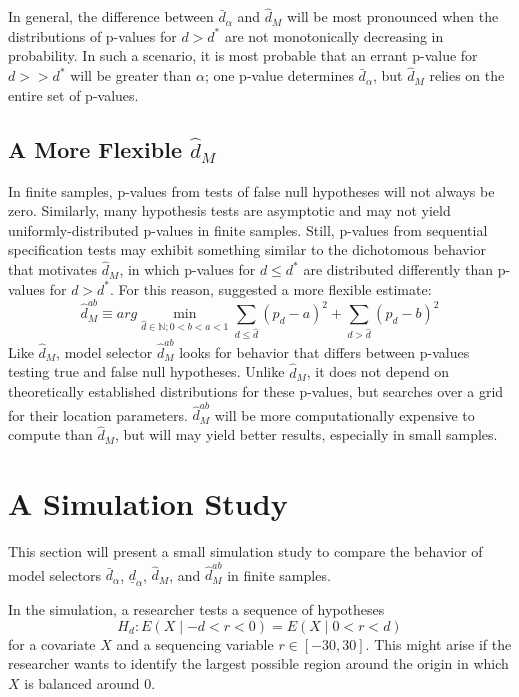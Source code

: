 \documentclass[lineno]{biometrika}\usepackage[]{graphicx}\usepackage[]{color}
\newcommand{\dalphaU}{\bar{d}_\alpha}
\newcommand{\dalphaB}{\underline{d}_\alpha}
\newcommand{\dstar}{d^*}
\newcommand{\dhat}{\hat{d}}
\newcommand{\dhatm}{\hat{d}_M}
\newcommand{\dhatmab}{\hat{d}^{ab}_M}
\newcommand{\EE}{E}
\begin{document}
In general, the difference between $\dalphaU$ and $\dhatm$ will be
most pronounced when the distributions of p-values for $d>\dstar$ are
not monotonically decreasing in probability. In such a scenario, it
is most probable that an errant p-value for $d>>\dstar$ will be
greater than $\alpha$; one p-value determines $\dalphaU$, but
$\dhatm$ relies on the entire set of p-values.

\subsection{A More Flexible $\dhatm$}
In finite samples, p-values from tests of false null hypotheses will
not always be zero.
Similarly, many hypothesis tests are asymptotic and may not yield
uniformly-distributed p-values in finite samples.
Still, p-values from sequential specification tests may exhibit something similar to the
dichotomous behavior that motivates $\dhatm$, in which p-values for
$d\le \dstar$ are distributed differently than p-values for
$d>\dstar$.
For this reason, \citet{mallik} suggested a more flexible estimate:
\begin{equation*}
  \dhatmab \equiv arg\displaystyle\min_{\dhat\in \mathbb{N}; 0<b<a<1}
  \displaystyle\sum_{d\le \dhat} ( p_d
  -a)^2+\displaystyle\sum_{d>\dhat} (p_d-b)^2
\end{equation*}
Like $\dhatm$, model selector $\dhatmab$ looks for behavior that
differs between p-values testing true and false null hypotheses.
Unlike $\dhatm$, it does not depend on theoretically established
distributions for these p-values, but searches over a grid for their
location parameters.
$\dhatmab$ will be more computationally expensive to compute than
$\dhatm$, but will may yield better results, especially in small
samples.



\section{A Simulation Study}\label{sec:simulation}

This section will present a small simulation study to compare the
behavior of model selectors $\dalphaU$, $\dalphaB$,
$\dhatm$, and $\dhatmab$ in finite samples.

In the simulation, a researcher tests a sequence of hypotheses
\begin{equation}\label{eq:nullSim}
H_d: \EE (X\mid-d<r<0)=\EE (X\mid0<r<d)
\end{equation}
for a covariate $X$ and a sequencing variable $r\in [-30,30]$.
This might arise if the researcher wants to identify the largest
possible region around the origin in which $X$ is balanced around 0.
\end{document}
